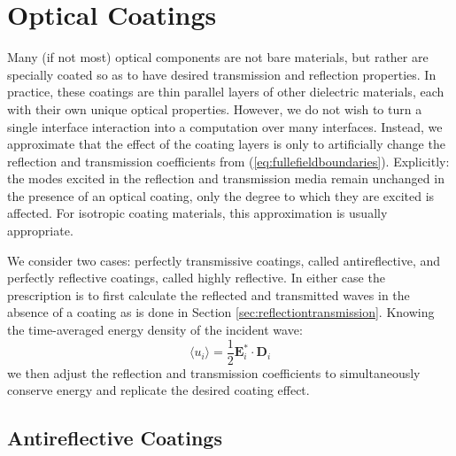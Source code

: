 \documentclass[11pt, reqno]{book}%
\newcounter{ct}
\newcommand{\es}{\begin{equation}}
\newcommand{\ef}{\end{equation} \vspace{0.05in}}
\newcommand{\mbf}{\mathbf}
\begin{document}

\section{Optical Coatings}
\label{sec:coatings}

Many (if not most) optical components are not bare materials, but rather are specially coated so as to have desired transmission and reflection properties. In practice, these coatings are thin parallel layers of other dielectric materials, each with their own unique optical properties. However, we do not wish to turn a single interface interaction into a computation over many interfaces. Instead, we approximate that the effect of the coating layers is only to artificially change the reflection and transmission coefficients from (\ref{eq:fullefieldboundaries}). Explicitly: the modes excited in the reflection and transmission media remain unchanged in the presence of an optical coating, only the degree to which they are excited is affected. For isotropic coating materials, this approximation is usually appropriate.

We consider two cases: perfectly transmissive coatings, called antireflective, and perfectly reflective coatings, called highly reflective. In either case the prescription is to first calculate the reflected and transmitted waves in the absence of a coating as is done in Section \ref{sec:reflectiontransmission}. Knowing the time-averaged energy density of the incident wave:
\es
\langle u_i \rangle = \frac{1}{2} \mbf{E}^*_i \cdot \mbf{D}_i
\label{eq:energydenseincident}
\ef 
\noindent we then adjust the reflection and transmission coefficients to simultaneously conserve energy and replicate the desired coating effect.





\subsection{Antireflective Coatings}
\label{sec:ARcoats}
\end{document}
